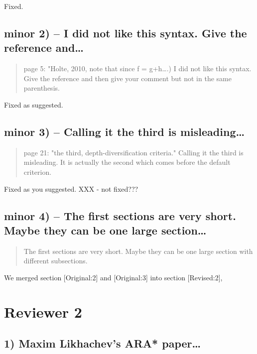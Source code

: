 \documentclass{article}
\begin{document}
Fixed.

\subsection{minor 2) -- I did not like this syntax. Give the reference and\ldots{}}
\label{sec:orgheadline10}

\begin{quote}
page 5: "Holte, 2010, note that since f = g+h\ldots{}.) I did not like this
syntax. Give the reference and then give your comment but not in the
same parenthesis.
\end{quote}

Fixed as suggested.

\subsection{minor 3) -- Calling it the  third is misleading\ldots{}}
\label{sec:orgheadline11}

\begin{quote}
page 21: "the third, depth-diversification criteria." Calling it the
third is misleading. It is actually the second which comes before the
default criterion.
\end{quote}

Fixed as you suggested.  XXX - not fixed???

\subsection{minor 4) -- The first sections are very short. Maybe they can be one large section\ldots{}}
\label{sec:orgheadline12}

\begin{quote}
The first sections are very short. Maybe they can be one large section
with different subsections.
\end{quote}

We merged section [Original:2] and [Original:3] into section [Revised:2],

\section{Reviewer 2}
\label{sec:orgheadline25}

\subsection{1) Maxim Likhachev's ARA* paper\ldots{}}
\label{sec:orgheadline14}
\end{document}
